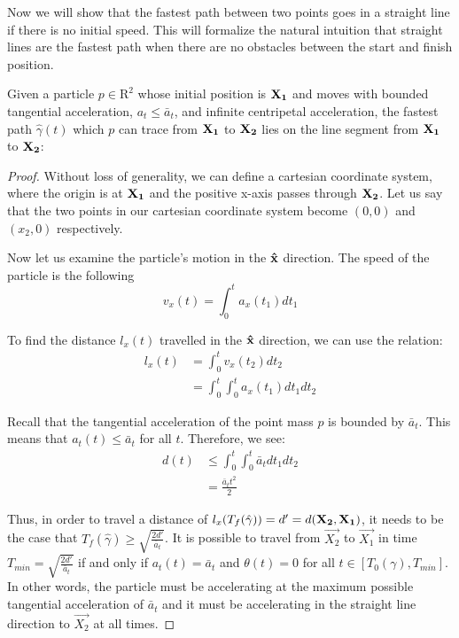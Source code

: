 Now we will show that the fastest path between two points goes in a straight line if there is no initial speed. This will formalize the natural intuition that straight lines are the fastest path when there are no obstacles between the start and finish position.

\begin{theorem}
  Given a particle $p \in \mathrm{R}^2$ whose initial position is $\mathbf{X_1}$ and moves with bounded tangential acceleration, $a_t \le \bar{a}_{t}$, and infinite centripetal acceleration, the fastest path $\hat{\gamma}(t)$ which $p$ can trace from $\mathbf{X_1}$ to $\mathbf{X_2}$ lies on the line segment from $\mathbf{X_1}$ to $\mathbf{X_2}$:
\end{theorem}

\begin{proof}

Without loss of generality, we can define a cartesian coordinate system, where the origin is at $\mathbf{X_1}$ and the positive x-axis passes through $\mathbf{X_2}$. Let us say that the two points in our cartesian coordinate system become $(0,0)$ and $(x_2, 0)$ respectively.

Now let us examine the particle's motion in the $\mathbf{\hat{x}}$ direction. The speed of the particle is the following
\begin{equation}
  v_x(t) = \int_0^t a_x(t_1) dt_1
\end{equation}

To find the distance $l_x(t)$ travelled in the $\mathbf{\hat{x}}$ direction, we can use the relation:
\begin{align}
  l_x(t) &= \int_0^t v_x(t_2) dt_2 \\
  &= \int_0^t \int_0^t a_x(t_1) dt_1 dt_2
\end{align}

Recall that the tangential acceleration of the point mass $p$ is bounded by $\bar{a}_{t}$. This means that $a_t(t) \leq \bar{a}_t$ for all $t$. Therefore, we see:
\begin{align}
  d(t) &\leq \int_0^t \int_0^t \bar{a}_t dt_1 dt_2\\
  &= \frac{\bar{a}_t t^2}{2}
\end{align}

Thus, in order to travel a distance of $l_x(T_f(\hat{\gamma})) = d' = d(\mathbf{X_2}, \mathbf{X_1})$, it needs to be the case that $T_f(\hat{\gamma}) \geq \sqrt{\frac{2 d'}{\bar{a}_t}}$. It is possible to travel from $\vec{X_2}$ to $\vec{X_1}$ in time $T_{min} = \sqrt{\frac{2 d'}{\bar{a}_t}}$ if and only if $a_t(t) = \bar{a}_t$ and $\theta(t) = 0$ for all $t \in [T_0(\gamma), T_{min}]$. In other words, the particle must be accelerating at the maximum possible tangential acceleration of $\bar{a}_t$ and it must be accelerating in the straight line direction to $\vec{X_2}$ at all times.


\end{proof}
